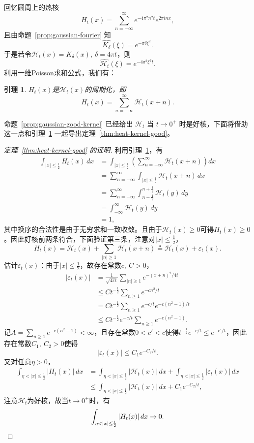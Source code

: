 \documentclass[UTF8,zihao=5,linespread=1.34]{ctexart}
\theoremstyle{cnplain}
\newtheorem{lemma}[theorem]{引理}
\theoremstyle{cnremark}
\begin{document}
回忆圆周上的热核
\[
H_t(x) = \sum_{n=-\infty}^{\infty} e^{-4\pi^{2}n^{2}t} e^{2\pi inx},
\]
且由命题~\ref{prop:gaussian-fourier} 知
\[
\widehat{K_{\delta}}(\xi) = e^{-\pi\delta \xi^{2}}.
\]
于是若令$\mathcal{H}_t(x) = K_{\delta}(x),\ \delta = 4\pi t$，则
\[
\widehat{\mathcal{H}_t}(\xi) = e^{-4\pi^{2}\xi^{2}t}.
\]
利用一维Poisson求和公式，我们有：

\begin{lemma}\label{lem:heat-periodization}
$H_t(x)$是$\mathcal{H}_t(x)$的周期化，即
\[
H_t(x) = \sum_{n=-\infty}^{\infty} \mathcal{H}_t(x+n).
\]
\end{lemma}

命题~\ref{prop:gaussian-good-kernel} 已经给出 $\mathcal{H}_t$ 当 $t \rightarrow 0^{+}$ 时是好核，下面将借助这一点和引理~\ref{lem:heat-periodization} 一起导出定理~\ref{thm:heat-kernel-good}。

\begin{proof}[定理~\ref{thm:heat-kernel-good} 的证明]
利用引理~\ref{lem:heat-periodization}，有
\begin{align*}
\int_{|x| \leq \frac{1}{2}} H_t(x)\,dx
&= \int_{|x| \leq \frac{1}{2}} \left( \sum_{n=-\infty}^{\infty} \mathcal{H}_t(x+n) \right) dx \\
&= \sum_{n=-\infty}^{\infty} \int_{|x| \leq \frac{1}{2}} \mathcal{H}_t(x+n)\,dx \\
&= \sum_{n=-\infty}^{\infty} \int_{n-\frac{1}{2}}^{n+\frac{1}{2}} \mathcal{H}_t(y)\,dy \\
&= \int_{-\infty}^{\infty} \mathcal{H}_t(y)\,dy \\
&= 1,
\end{align*}
其中换序的合法性是由于无穷求和一致收敛。且由于$\mathcal{H}_t(x) \geq 0$可得$H_t(x) \geq 0$。因此好核前两条符合，下面验证第三条，注意对$|x| \leq \frac{1}{2}$，
\[
H_t(x) = \mathcal{H}_t(x) + \sum_{|n| \geq 1} \mathcal{H}_t(x+n) \triangleq \mathcal{H}_t(x) + \varepsilon_t(x).
\]
估计$\varepsilon_t(x)$：由于$|x| \leq \frac{1}{2}$，故存在常数$c,\ C > 0$，
\begin{align*}
|\varepsilon_t(x)|
&= \frac{1}{\sqrt{4\pi t}} \sum_{|n| \geq 1} e^{-(x+n)^{2}/4t} \\
&\leq C t^{-\frac{1}{2}} \sum_{n \geq 1} e^{-c n^{2}/t} \\
&= C t^{-\frac{1}{2}} \sum_{n \geq 1} e^{-c/t} e^{-c(n^{2}-1)/t} \\
&\leq C t^{-\frac{1}{2}} e^{-c/t} \sum_{n \geq 1} e^{-c(n^{2}-1)}.
\end{align*}
记$A = \sum_{n \geq 1} e^{-c(n^{2}-1)} < \infty$，且存在常数$0 < c' < c$使得$t^{-\frac{1}{2}} e^{-c/t} \leq e^{-c'/t}$，因此存在常数$C_1,\ C_2 > 0$使得
\[
|\varepsilon_t(x)| \leq C_1 e^{-C_2/t}.
\]
又对任意$\eta > 0$，
\begin{align*}
\int_{\eta < |x| \leq \frac{1}{2}} |H_t(x)|\,dx
&= \int_{\eta < |x| \leq \frac{1}{2}} |\mathcal{H}_t(x)|\,dx + \int_{\eta < |x| \leq \frac{1}{2}} |\varepsilon_t(x)|\,dx \\
&\leq \int_{\eta < |x| \leq \frac{1}{2}} |\mathcal{H}_t(x)|\,dx + C_1 e^{-C_2/t},
\end{align*}
注意$\mathcal{H}_t$为好核，故当$t \rightarrow 0^{+}$时，有
\[
\int_{\eta < |x| \leq \frac{1}{2}} |H_t(x)|\,dx \rightarrow 0.\qedhere
\]
\end{proof}
\end{document}
